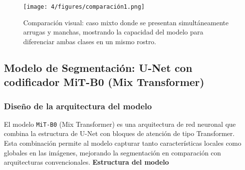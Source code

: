 \begin{figure}[H]
\centering
\texttt{[image: 4/figures/comparación1.png]}
\caption{Comparación visual: caso mixto donde se presentan simultáneamente arrugas y manchas, mostrando la capacidad del modelo para diferenciar ambas clases en un mismo rostro.}
\label{fig:validacion3}
\end{figure}

\subsection{Modelo de Segmentación: U-Net con codificador MiT-B0 (Mix Transformer)}

\subsubsection{Diseño de la arquitectura del modelo}
El modelo \texttt{MiT-B0} (Mix Transformer) es una arquitectura de red neuronal que combina la estructura de U-Net con bloques de atención de tipo Transformer. Esta combinación permite al modelo capturar tanto características locales como globales en las imágenes, mejorando la segmentación en comparación con arquitecturas convencionales.
\textbf{Estructura del modelo}
